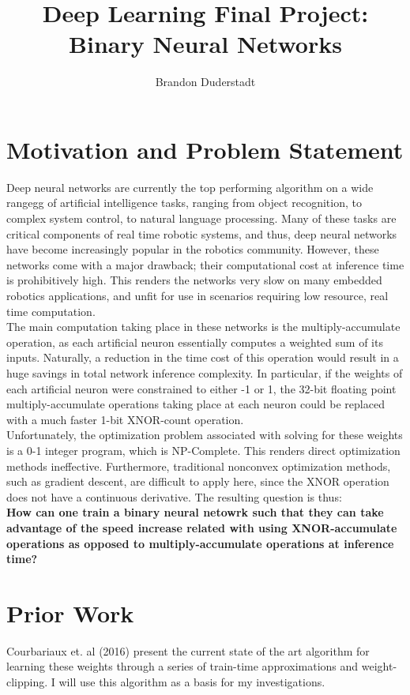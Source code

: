 \documentclass{article}
\title{Deep Learning Final Project: Binary Neural Networks}
\author{Brandon Duderstadt}
\begin{document}
  \maketitle
  \section{Motivation and Problem Statement}

    Deep neural networks are currently the top performing algorithm on a wide rangegg of artificial intelligence tasks, ranging from object recognition, to complex system control, to natural language processing.
    Many of these tasks are critical components of real time robotic systems, and thus, deep neural networks have become increasingly popular in the robotics community.
    However, these networks come with a major drawback; their computational cost at inference time is prohibitively high.
    This renders the networks very slow on many embedded robotics applications, and unfit for use in scenarios requiring low resource, real time computation.\\[6pt]

    The main computation taking place in these networks is the multiply-accumulate operation, as each artificial neuron essentially computes a weighted sum of its inputs.
    Naturally, a reduction in the time cost of this operation would result in a huge savings in total network inference complexity.
    In particular, if the weights of each artificial neuron were constrained to either -1 or 1, the 32-bit floating point multiply-accumulate operations taking place at each neuron could be replaced with a much faster 1-bit XNOR-count operation.\\[6pt]

    Unfortunately, the optimization problem associated with solving for these weights is a 0-1 integer program, which is NP-Complete. This renders direct optimization methods ineffective. Furthermore, traditional nonconvex optimization methods, such as gradient descent, are difficult to apply here, since the XNOR operation does not have a continuous derivative. The resulting question is thus: \\[6pt]
    \textbf{How can one train a binary neural netowrk such that they can take advantage of the speed increase related with using XNOR-accumulate operations as opposed to multiply-accumulate operations at inference time?}

  \section{Prior Work}
    Courbariaux et. al (2016) \cite{bnn} present the current state of the art algorithm for learning these weights through a series of train-time approximations and weight-clipping. I will use this algorithm as a basis for my investigations.
\end{document}
